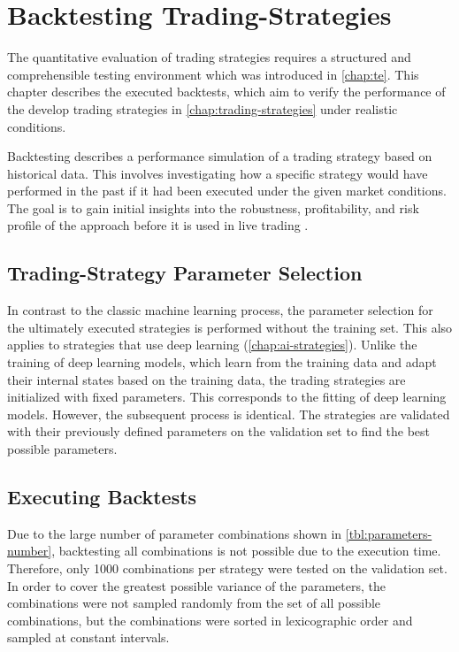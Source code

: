 \section{Backtesting Trading-Strategies}

The quantitative evaluation of trading strategies requires a structured and comprehensible testing environment which was introduced in \autoref{chap:te}.
This chapter describes the executed backtests, which aim to verify the performance of the develop trading strategies in \autoref{chap:trading-strategies} under realistic conditions.

Backtesting describes a performance simulation of a trading strategy based on historical data.
This involves investigating how a specific strategy would have performed in the past if it had been executed under the given market conditions.
The goal is to gain initial insights into the robustness, profitability, and risk profile of the approach before it is used in live trading \cite{backtesting}.

\subsection{Trading-Strategy Parameter Selection}

In contrast to the classic machine learning process, the parameter selection for the ultimately executed strategies is performed without the training set.
This also applies to strategies that use deep learning (\autoref{chap:ai-strategies}).
Unlike the training of deep learning models, which learn from the training data and adapt their internal states based on the training data, the trading strategies are initialized with fixed parameters.
This corresponds to the fitting of deep learning models.
However, the subsequent process is identical.
The strategies are validated with their previously defined parameters on the validation set to find the best possible parameters.

\subsection{Executing Backtests}

Due to the large number of parameter combinations shown in \autoref{tbl:parameters-number}, backtesting all combinations is not possible due to the execution time.
Therefore, only 1000 combinations per strategy were tested on the validation set.
In order to cover the greatest possible variance of the parameters, the combinations were not sampled randomly from the set of all possible combinations, but the combinations were sorted in lexicographic order and sampled at constant intervals.

